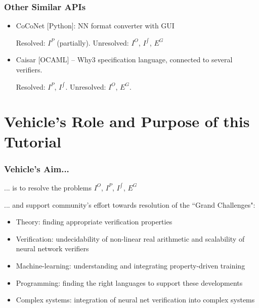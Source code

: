\documentclass[t,compress,aspectratio=169]{beamer}
\begin{document}
\begin{frame}
\frametitle{Other Similar APIs}

\begin{itemize}

\item CoCoNet [Python]: NN format converter with GUI

\begin{thebibliography}{99}
	\beamertemplatearticlebibitems
\end{thebibliography}
 
\vspace{0.5em}

Resolved: $I^P$ (partially). Unresolved: $I^O$, $I^{\int}$, $E^G$

\pause
\vspace{1.5em}

\item Caisar [OCAML] -- Why3 specification language, connected to several verifiers.

\begin{thebibliography}{99}
\beamertemplatearticlebibitems
{}
\end{thebibliography}

Resolved: $I^P$, $I^{\int}$. Unresolved: $I^O$,  $E^G$.
\end{itemize}
\end{frame}


\section{\textbf{Vehicle}'s Role and Purpose of this Tutorial}

\begin{frame}
\frametitle{Vehicle's Aim...}

... is to resolve the problems $I^O$, $I^P$, $I^{\int}$, $E^G$
\pause
\vspace{1em}

... and support community's effort towards resolution of the ``Grand Challenges":

\pause  
\vspace{1em}

\begin{itemize}
\item Theory: finding appropriate verification properties
\item  Verification: undecidability of non-linear real arithmetic  and scalability of neural network verifiers
\item \alert{Machine-learning: understanding and integrating property-driven training}
\item \alert{Programming: finding the right languages to support these developments}
\item \alert{Complex systems: integration of neural net verification into complex systems}
  \end{itemize}
\end{frame}
\end{document}
